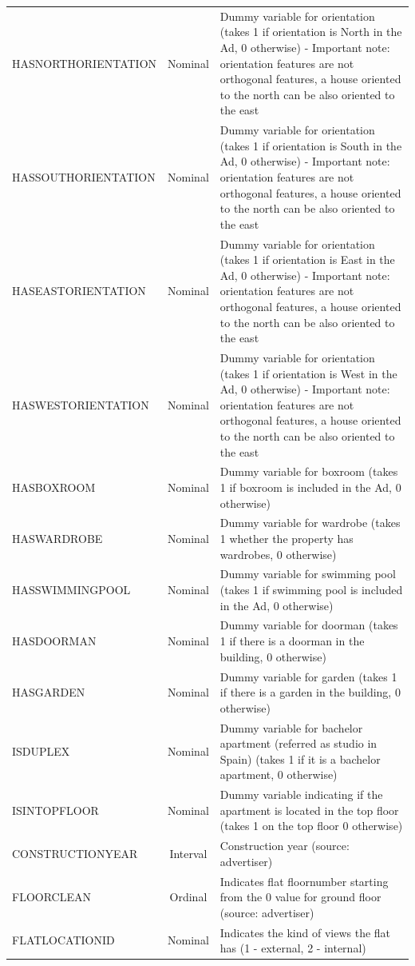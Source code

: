 \documentclass[times,final]{elsarticle}
\begin{document}
\begin{footnotesize}
\begin{longtable}{p{40mm} c p{63mm}}
HASNORTHORIENTATION & Nominal & Dummy variable for orientation (takes 1 if orientation is North in the Ad, 0 otherwise) - Important note: orientation features are not orthogonal features, a house oriented to the north can be also oriented to the east\\
HASSOUTHORIENTATION & Nominal & Dummy variable for orientation (takes 1 if orientation is South in the Ad, 0 otherwise) - Important note: orientation features are not orthogonal features, a house oriented to the north can be also oriented to the east\\
HASEASTORIENTATION & Nominal & Dummy variable for orientation (takes 1 if orientation is East in the Ad, 0 otherwise) - Important note: orientation features are not orthogonal features, a house oriented to the north can be also oriented to the east\\
HASWESTORIENTATION & Nominal & Dummy variable for orientation (takes 1 if orientation is West in the Ad, 0 otherwise) - Important note: orientation features are not orthogonal features, a house oriented to the north can be also oriented to the east\\
HASBOXROOM & Nominal & Dummy variable for boxroom (takes 1 if boxroom is included in the Ad, 0 otherwise)\\
HASWARDROBE & Nominal & Dummy variable for wardrobe (takes 1 whether the property has wardrobes, 0 otherwise)\\
HASSWIMMINGPOOL & Nominal & Dummy variable for swimming pool (takes 1 if swimming pool is included in the Ad, 0 otherwise)\\
HASDOORMAN & Nominal & Dummy variable for doorman (takes 1 if there is a doorman in the building, 0 otherwise)\\
HASGARDEN & Nominal & Dummy variable for garden (takes 1 if there is a garden in the building, 0 otherwise)\\
ISDUPLEX & Nominal & Dummy variable for bachelor apartment (referred as studio in Spain) (takes 1 if it is a bachelor apartment, 0 otherwise)\\
ISINTOPFLOOR & Nominal & Dummy variable indicating if the apartment is located in the top floor (takes 1 on the top floor 0 otherwise)\\
CONSTRUCTIONYEAR & Interval & Construction year (source: advertiser)\\
FLOORCLEAN & Ordinal & Indicates flat floornumber starting from the 0 value for ground floor (source: advertiser)\\
FLATLOCATIONID & Nominal & Indicates the kind of views the flat has (1 - external, 2 - internal)\\

\end{longtable}
\end{footnotesize}
\end{document}
